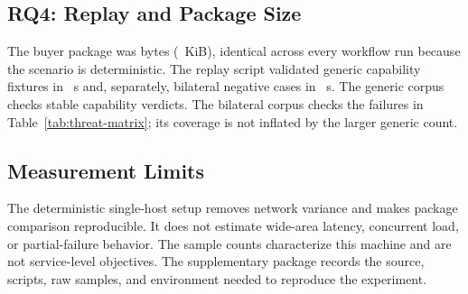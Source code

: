 \subsection{RQ4: Replay and Package Size}

The buyer package was \PSProofPackageBytes{} bytes
(\PSProofPackageKiB~KiB), identical across every workflow run because the
scenario is deterministic. The replay script validated
\PSGenericReplayCases{} generic capability fixtures in
\PSGenericReplaySeconds~s and, separately,
\PSBilateralReplayCases{} bilateral negative cases in
\PSBilateralReplaySeconds~s. The generic corpus checks stable capability
verdicts. The bilateral corpus checks the failures in
Table~\ref{tab:threat-matrix}; its coverage is not inflated by the larger
generic count.

\subsection{Measurement Limits}

The deterministic single-host setup removes network variance and makes package
comparison reproducible. It does not estimate wide-area latency, concurrent
load, or partial-failure behavior. The sample counts characterize this machine
and are not service-level objectives. The supplementary package records the
source, scripts, raw samples, and environment needed to reproduce the
experiment.
